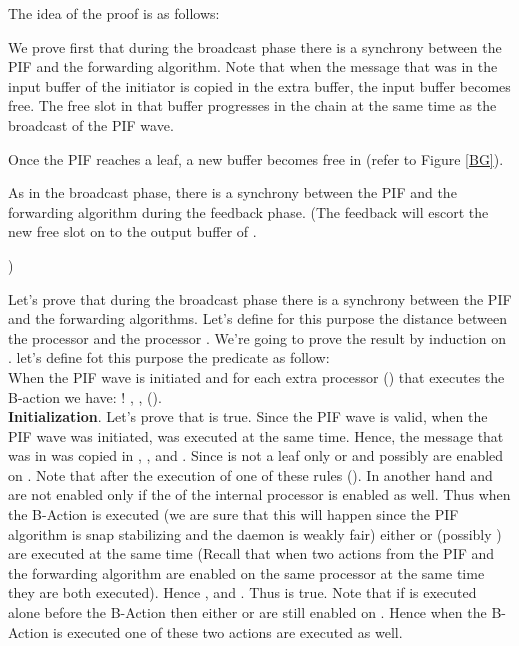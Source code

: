 \documentclass{llncs}
\renewenvironment{proof}{{\it Proof. } }{{\hfill }\vspace{.5pc}}
\begin{document}
\begin{proof}
The idea of the proof is as follows: 
\begin{itemize}
\item{We prove first that during the broadcast phase there is a synchrony between the PIF and the forwarding
algorithm. Note that when the message that was in the input buffer of the initiator is copied in the extra buffer, the
input buffer becomes free. The free slot in that buffer progresses in the chain at the same time as the broadcast of the PIF
wave.}
\item{Once the PIF reaches a leaf, a new buffer becomes free in  (refer to Figure \ref{BG}).
\item{As in the broadcast phase, there is a synchrony between the PIF and the forwarding algorithm
during the feedback phase. (The feedback will escort the new free slot on  to the output buffer of .}})
\end{itemize}

Let's prove that during the broadcast phase there is a synchrony between the PIF and the forwarding algorithms.
Let's define for this purpose  the distance between the processor  and  the processor . We're going to prove the result  by induction on . let's define fot this purpose the predicate  as follow: \\

When the PIF wave is initiated and for each extra processor  () that executes the B-action we have: ! , ,       ().\\

\textbf{Initialization}. Let's prove that  is true. Since the PIF wave is valid, when the PIF wave was
initiated,  was executed at the same time. Hence, the message that was in  was copied in
, ,  and . Since  is not a leaf only
 or  and possibly  are enabled on . Note that after the execution of one of these rules
 (). In another hand  and  are not enabled only if the
 of the internal processor is enabled as well. Thus when the B-Action is executed (we are sure that this
will happen since the PIF algorithm is snap stabilizing and the daemon is weakly fair) either  or  (possibly
) are executed at the same time (Recall that when two actions from the PIF and the forwarding algorithm are
enabled on the same processor at the same time they are both executed). Hence ,
 and . Thus  is true. Note that if  is executed alone before the B-Action
then either  or  are still enabled on . Hence when the B-Action is executed one of these two actions are
executed as well.


\end{proof}
\end{document}
